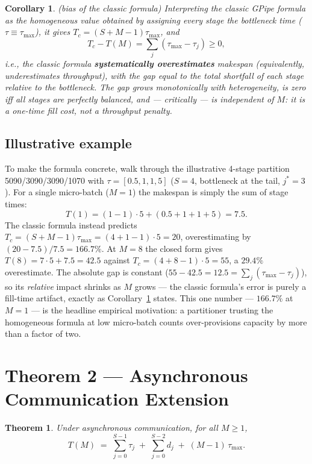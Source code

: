 \documentclass[11pt]{article}
\newtheorem{theorem}{Theorem}
\newtheorem{corollary}{Corollary}
\begin{document}
\begin{corollary}\label{cor:1}(bias of the classic formula)
Interpreting the classic GPipe formula as the homogeneous value obtained by assigning every stage the bottleneck time ($\tau\equiv\tau_{\max}$), it gives $T_c=(S+M-1)\tau_{\max}$, and
\[
T_c - T(M) = \sum_j(\tau_{\max}-\tau_j) \ge 0,
\]
i.e., the classic formula \textbf{systematically overestimates} makespan (equivalently, underestimates throughput), with the gap equal to the total shortfall of each stage relative to the bottleneck. The gap grows monotonically with heterogeneity, is zero iff all stages are perfectly balanced, and --- critically --- is independent of $M$: it is a one-time fill cost, not a throughput penalty.
\end{corollary}

\subsection{Illustrative example}\label{sec:example}

To make the formula concrete, walk through the illustrative 4-stage partition 5090/3090/3090/1070 with $\tau=[0.5,1,1,5]$ ($S=4$, bottleneck at the tail, $j^*=3$). For a single micro-batch ($M=1$) the makespan is simply the sum of stage times:
\[
T(1) = (1-1)\cdot 5 + (0.5+1+1+5) = 7.5 .
\]
The classic formula instead predicts $T_c=(S+M-1)\tau_{\max}=(4+1-1)\cdot 5=20$, overestimating by $(20-7.5)/7.5=166.7\%$. At $M=8$ the closed form gives $T(8)=7\cdot 5+7.5=42.5$ against $T_c=(4+8-1)\cdot 5=55$, a $29.4\%$ overestimate. The absolute gap is constant ($55-42.5=12.5=\sum_j(\tau_{\max}-\tau_j)$), so its \emph{relative} impact shrinks as $M$ grows --- the classic formula's error is purely a fill-time artifact, exactly as Corollary~\ref{cor:1} states. This one number --- $166.7\%$ at $M=1$ --- is the headline empirical motivation: a partitioner trusting the homogeneous formula at low micro-batch counts over-provisions capacity by more than a factor of two.

\section{Theorem 2 --- Asynchronous Communication Extension}\label{sec:thm2}

\begin{theorem}\label{thm:2}
Under asynchronous communication, for all $M\ge 1$,
\[
T(M) \;=\; \sum_{j=0}^{S-1}\tau_j \;+\; \sum_{j=0}^{S-2} d_j \;+\; (M-1)\,\tau_{\max} .
\]
\end{theorem}
\end{document}
